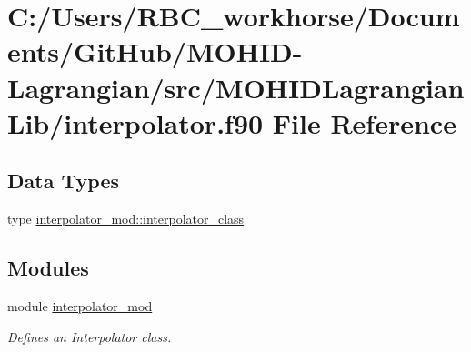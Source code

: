 \hypertarget{interpolator_8f90}{}\section{C\+:/\+Users/\+R\+B\+C\+\_\+workhorse/\+Documents/\+Git\+Hub/\+M\+O\+H\+I\+D-\/\+Lagrangian/src/\+M\+O\+H\+I\+D\+Lagrangian\+Lib/interpolator.f90 File Reference}
\label{interpolator_8f90}
\subsection*{Data Types}
\begin{DoxyCompactItemize}
\item 
type \mbox{\hyperlink{structinterpolator__mod_1_1interpolator__class}{interpolator\+\_\+mod\+::interpolator\+\_\+class}}
\end{DoxyCompactItemize}
\subsection*{Modules}
\begin{DoxyCompactItemize}
\item 
module \mbox{\hyperlink{namespaceinterpolator__mod}{interpolator\+\_\+mod}}
\begin{DoxyCompactList}\small\item\em Defines an Interpolator class. \end{DoxyCompactList}\end{DoxyCompactItemize}

